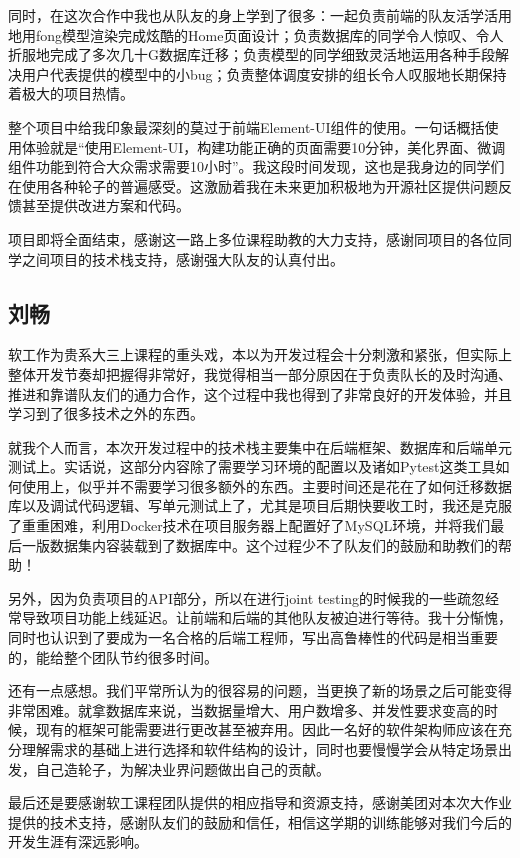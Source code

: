 \documentclass[12pt]{article}
\begin{document}
同时，在这次合作中我也从队友的身上学到了很多：一起负责前端的队友活学活用地用fong模型渲染完成炫酷的Home页面设计；负责数据库的同学令人惊叹、令人折服地完成了多次几十G数据库迁移；负责模型的同学细致灵活地运用各种手段解决用户代表提供的模型中的小bug；负责整体调度安排的组长令人叹服地长期保持着极大的项目热情。

整个项目中给我印象最深刻的莫过于前端Element-UI组件的使用。一句话概括使用体验就是“使用Element-UI，构建功能正确的页面需要10分钟，美化界面、微调组件功能到符合大众需求需要10小时”。我这段时间发现，这也是我身边的同学们在使用各种轮子的普遍感受。这激励着我在未来更加积极地为开源社区提供问题反馈甚至提供改进方案和代码。

项目即将全面结束，感谢这一路上多位课程助教的大力支持，感谢同项目的各位同学之间项目的技术栈支持，感谢强大队友的认真付出。

\subsection{刘畅}
软工作为贵系大三上课程的重头戏，本以为开发过程会十分刺激和紧张，但实际上整体开发节奏却把握得非常好，我觉得相当一部分原因在于负责队长的及时沟通、推进和靠谱队友们的通力合作，这个过程中我也得到了非常良好的开发体验，并且学习到了很多技术之外的东西。

就我个人而言，本次开发过程中的技术栈主要集中在后端框架、数据库和后端单元测试上。实话说，这部分内容除了需要学习环境的配置以及诸如Pytest这类工具如何使用上，似乎并不需要学习很多额外的东西。主要时间还是花在了如何迁移数据库以及调试代码逻辑、写单元测试上了，尤其是项目后期快要收工时，我还是克服了重重困难，利用Docker技术在项目服务器上配置好了MySQL环境，并将我们最后一版数据集内容装载到了数据库中。这个过程少不了队友们的鼓励和助教们的帮助！

另外，因为负责项目的API部分，所以在进行joint testing的时候我的一些疏忽经常导致项目功能上线延迟。让前端和后端的其他队友被迫进行等待。我十分惭愧，同时也认识到了要成为一名合格的后端工程师，写出高鲁棒性的代码是相当重要的，能给整个团队节约很多时间。

还有一点感想。我们平常所认为的很容易的问题，当更换了新的场景之后可能变得非常困难。就拿数据库来说，当数据量增大、用户数增多、并发性要求变高的时候，现有的框架可能需要进行更改甚至被弃用。因此一名好的软件架构师应该在充分理解需求的基础上进行选择和软件结构的设计，同时也要慢慢学会从特定场景出发，自己造轮子，为解决业界问题做出自己的贡献。

最后还是要感谢软工课程团队提供的相应指导和资源支持，感谢美团对本次大作业提供的技术支持，感谢队友们的鼓励和信任，相信这学期的训练能够对我们今后的开发生涯有深远影响。
\end{document}
